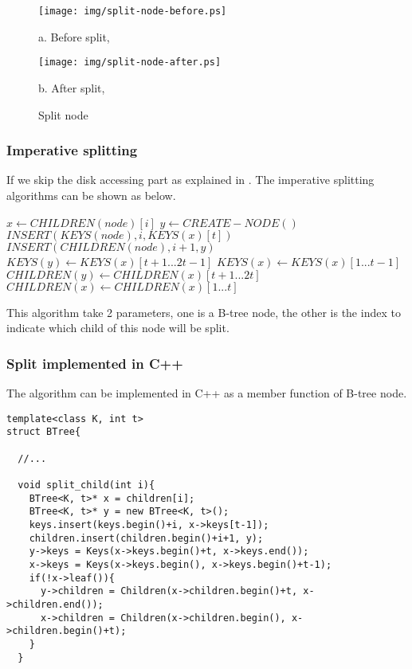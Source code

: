 \documentclass{article}
\begin{document}
\begin{figure}[htbp]
       \begin{center}
       	  \texttt{[image: img/split-node-before.ps]}

          a. Before split,

          \texttt{[image: img/split-node-after.ps]}

          b. After split,
        \caption{Split node} \label{fig:node-split}
       \end{center}
\end{figure}

\subsubsection{Imperative splitting}
If we skip the disk accessing part as explained in \cite{CLRS}. The
imperative splitting algorithms can be shown as below.

\begin{algorithmic}[1]
  \State $x \leftarrow CHILDREN(node)[i]$
  \State $y \leftarrow CREATE-NODE()$
  \State $INSERT(KEYS(node), i, KEYS(x)[t])$
  \State $INSERT(CHILDREN(node), i+1, y)$
  \State $KEYS(y) \leftarrow KEYS(x)[t+1 ... 2t-1]$
  \State $KEYS(x) \leftarrow KEYS(x)[1 ... t-1]$
    \State $CHILDREN(y) \leftarrow CHILDREN(x)[t+1 ... 2t]$
    \State $CHILDREN(x) \leftarrow CHILDREN(x)[1 ... t]$
  \EndIf
\EndProcedure
\end{algorithmic}

This algorithm take 2 parameters, one is a B-tree node, the other
is the index to indicate which child of this node will be split.

\subsubsection*{Split implemented in C++}
The algorithm can be implemented in C++ as a member function of
B-tree node.

\lstset{language=C++}
\begin{lstlisting}
template<class K, int t>
struct BTree{

  //...

  void split_child(int i){
    BTree<K, t>* x = children[i];
    BTree<K, t>* y = new BTree<K, t>();
    keys.insert(keys.begin()+i, x->keys[t-1]);
    children.insert(children.begin()+i+1, y);
    y->keys = Keys(x->keys.begin()+t, x->keys.end());
    x->keys = Keys(x->keys.begin(), x->keys.begin()+t-1);
    if(!x->leaf()){
      y->children = Children(x->children.begin()+t, x->children.end());
      x->children = Children(x->children.begin(), x->children.begin()+t);
    }
  }
\end{lstlisting}
\end{document}

